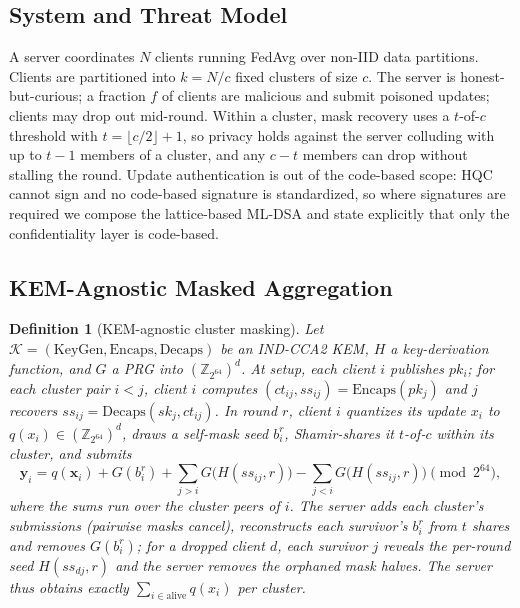 \documentclass[lettersize,journal]{IEEEtran}
\newtheorem{definition}{Definition}
\begin{document}
\subsection{System and Threat Model}
A server coordinates $N$ clients running FedAvg over non-IID data partitions.
Clients are partitioned into $k=N/c$ fixed clusters of size $c$. The server is
honest-but-curious; a fraction $f$ of clients are malicious and submit poisoned
updates; clients may drop out mid-round. Within a cluster, mask recovery uses a
$t$-of-$c$ threshold with $t=\lfloor c/2\rfloor+1$, so privacy holds against the
server colluding with up to $t-1$ members of a cluster, and any $c-t$ members can
drop without stalling the round. Update authentication is out of the code-based
scope: HQC cannot sign and no code-based signature is standardized, so where
signatures are required we compose the lattice-based ML-DSA \cite{fips204} and state
explicitly that only the confidentiality layer is code-based.

\subsection{KEM-Agnostic Masked Aggregation}
\begin{definition}[KEM-agnostic cluster masking]\label{def:kem}
Let $\mathcal{K}=(\mathrm{KeyGen},\mathrm{Encaps},\mathrm{Decaps})$ be an IND-CCA2
KEM, $H$ a key-derivation function, and $G$ a PRG into $(\mathbb{Z}_{2^{64}})^d$.
At setup, each client $i$ publishes $pk_i$; for each cluster pair $i<j$, client $i$
computes $(ct_{ij}, ss_{ij})=\mathrm{Encaps}(pk_j)$ and $j$ recovers
$ss_{ij}=\mathrm{Decaps}(sk_j, ct_{ij})$. In round $r$, client $i$ quantizes its
update $x_i$ to $q(x_i)\in(\mathbb{Z}_{2^{64}})^d$, draws a self-mask seed $b_i^r$,
Shamir-shares it $t$-of-$c$ within its cluster, and submits
\begin{equation}\label{eq:mask}
\mathbf{y}_i = q(\mathbf{x}_i) + G(b_i^r) + \!\sum_{j>i}\! G\!\big(H(ss_{ij}, r)\big)
      - \!\sum_{j<i}\! G\!\big(H(ss_{ij}, r)\big) \!\!\!\pmod{2^{64}},
\end{equation}
where the sums run over the cluster peers of $i$. The server adds each cluster's
submissions (pairwise masks cancel), reconstructs each survivor's $b_i^r$ from $t$
shares and removes $G(b_i^r)$; for a dropped client $d$, each survivor $j$ reveals
the per-round seed $H(ss_{dj}, r)$ and the server removes the orphaned mask halves.
The server thus obtains exactly $\sum_{i \in \mathrm{alive}} q(x_i)$ per cluster.
\end{definition}
\end{document}

